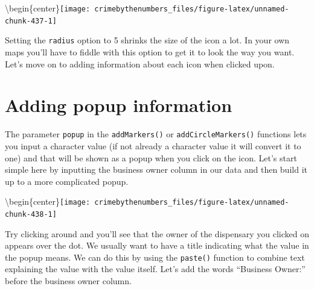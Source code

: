 \documentclass[
]{krantz}
\makeatletter
\newenvironment{Shaded}{\begin{snugshade}}{\end{snugshade}}
\newcommand{\AttributeTok}[1]{\textcolor[rgb]{0.61,0.61,0.61}{#1}}
\newcommand{\DecValTok}[1]{\textcolor[rgb]{0.06,0.06,0.06}{#1}}
\newcommand{\FunctionTok}[1]{\textcolor[rgb]{0,0,0}{#1}}
\newcommand{\NormalTok}[1]{#1}
\newcommand{\SpecialCharTok}[1]{\textcolor[rgb]{0,0,0}{#1}}
\newcommand{\StringTok}[1]{\textcolor[rgb]{0.5,0.5,0.5}{#1}}
\newenvironment{kframe}{%
\medskip{}
\setlength{\fboxsep}{.8em}
 \def\at@end@of@kframe{}%
 \ifinner\ifhmode%
  \def\at@end@of@kframe{\end{minipage}}%
  \begin{minipage}{\columnwidth}%
 \fi\fi%
 \def\FrameCommand##1{\hskip\@totalleftmargin \hskip-\fboxsep
 \colorbox{shadecolor}{##1}\hskip-\fboxsep
     \hskip-\linewidth \hskip-\@totalleftmargin \hskip\columnwidth}%
 \MakeFramed {\advance\hsize-\width
   \@totalleftmargin\z@ \linewidth\hsize
   \@setminipage}}%
 {\par\unskip\endMakeFramed%
 \at@end@of@kframe}
\renewenvironment{Shaded}{\begin{kframe}}{\end{kframe}}
\makeatother
\begin{document}
\textbackslash begin\{center\}\texttt{[image: crimebythenumbers\_files/figure-latex/unnamed-chunk-437-1]}

Setting the \texttt{radius} option to 5 shrinks the size of the icon a lot. In your own maps you'll have to fiddle with this option to get it to look the way you want. Let's move on to adding information about each icon when clicked upon.

\hypertarget{adding-popup-information}{%
\section{Adding popup information}\label{adding-popup-information}}

The parameter \texttt{popup} in the \texttt{addMarkers()} or \texttt{addCircleMarkers()} functions lets you input a character value (if not already a character value it will convert it to one) and that will be shown as a popup when you click on the icon. Let's start simple here by inputting the business owner column in our data and then build it up to a more complicated popup.

\begin{Shaded}
\end{Shaded}

\textbackslash begin\{center\}\texttt{[image: crimebythenumbers\_files/figure-latex/unnamed-chunk-438-1]}

Try clicking around and you'll see that the owner of the dispensary you clicked on appears over the dot. We usually want to have a title indicating what the value in the popup means. We can do this by using the \texttt{paste()} function to combine text explaining the value with the value itself. Let's add the words ``Business Owner:'' before the business owner column.
\end{document}
